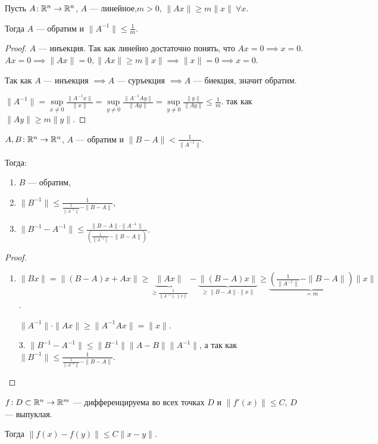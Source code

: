 \begin{theorem}
    Пусть $A\!: \mathbb{R}^n \to \mathbb{R}^n$,  $A$ --- линейное,$m > 0$,  $\|Ax\| \ge m \|x\|\ \forall x$.

    Тогда $A$ --- обратим и  $\|A^{-1}\| \le \frac{1}{m}$.
\end{theorem}
\begin{proof}
    $A$ --- инъекция. Так как линейно достаточно понять, что  $Ax = 0 \implies x = 0$. $Ax = 0 \implies \|Ax\| = 0, \|Ax\| \ge m\|x\| \implies \|x\| = 0 \implies x = 0$.

    Так как $A$ --- инъекция  $\implies A$ --- суръекция $\implies A$ --- биекция, значит обратим. 

    $\|A^{-1}\| = \sup\limits_{x \neq 0} \frac{\|A^{-1}x\|}{\|x\|} = \sup\limits_{y \neq 0} \frac{\|A^{-1}Ay\|}{\|Ay\|} = \sup\limits_{y \neq 0} \frac{\|y\|}{\|Ay\|} \le \frac{1}{m}$. так как $\|Ay\| \ge m \|y\|$.
\end{proof}
\begin{theorem}
    $A, B\!: \mathbb{R}^n \to \mathbb{R}^n$,  $A$ --- обратим и  $\|B-A\| < \frac{1}{\|A^{-1}\|}$.

    Тогда:
    \begin{enumerate}
        \item $B$ --- обратим,
        \item  $\|B^{-1}\| \le \frac{1}{\frac{1}{\|A^{-1}\|}- \|B-A\|}$,
        \item $\|B^{-1} - A^{-1}\| \le \frac{\|B-A\| \cdot \|A^{-1}\|}{(\frac{1}{\|A^{-1}\|} - \|B-A\|)}$.
    \end{enumerate}
\end{theorem}
\begin{proof}
   \slashn
   \begin{enumerate}
       \item    $\|Bx\| = \|(B-A)x + Ax\| \ge \underbrace{\|Ax\|}_{\ge \frac{1}{\|A^{-1}\| \cdot \|x\|}} - \underbrace{\|(B-A)x\|}_{\ge \|B-A\|\cdot\|x\|} \ge \underbrace{\left(\frac{1}{\|A^{-1}\|} - \|B-A\|\right)}_{=m}\|x\|$.

       $\|A^{-1}\| \cdot \|Ax\| \ge \|A^{-1}Ax\| = \|x\|$.
   \item[3.] $\|B^{-1} - A^{-1}\| \le \|B^{-1}\| \|A-B\|\|A^{-1}\|$, а так как $\|B^{-1}\| \le \frac{1}{\frac{1}{\|A^{-1}\|} - \|B-A\|}$.
   \end{enumerate}
\end{proof}
\begin{theorem}
    $f\!: D \subset \mathbb{R}^n \to \mathbb{R}^m$ --- дифференцируема во всех точках $D$ и $\|f'(x)\| \le C$, $D$ --- выпуклая.

    Тогда $\|f(x) - f(y)\| \le C\|x-y\|$.
\end{theorem}
